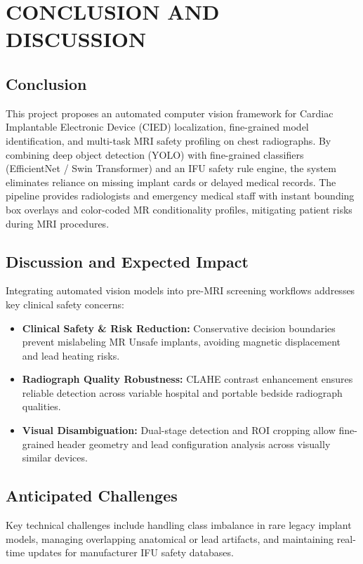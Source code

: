 \chapter*{CONCLUSION AND DISCUSSION}

\section{Conclusion}
This project proposes an automated computer vision framework for Cardiac Implantable Electronic Device (CIED) localization, fine-grained model identification, and multi-task MRI safety profiling on chest radiographs. By combining deep object detection (YOLO) with fine-grained classifiers (EfficientNet / Swin Transformer) and an IFU safety rule engine, the system eliminates reliance on missing implant cards or delayed medical records. The pipeline provides radiologists and emergency medical staff with instant bounding box overlays and color-coded MR conditionality profiles, mitigating patient risks during MRI procedures.

\section{Discussion and Expected Impact}
Integrating automated vision models into pre-MRI screening workflows addresses key clinical safety concerns:
\begin{itemize}
    \item \textbf{Clinical Safety \& Risk Reduction:} Conservative decision boundaries prevent mislabeling MR Unsafe implants, avoiding magnetic displacement and lead heating risks.
    \item \textbf{Radiograph Quality Robustness:} CLAHE contrast enhancement ensures reliable detection across variable hospital and portable bedside radiograph qualities.
    \item \textbf{Visual Disambiguation:} Dual-stage detection and ROI cropping allow fine-grained header geometry and lead configuration analysis across visually similar devices.
\end{itemize}

\section{Anticipated Challenges}
Key technical challenges include handling class imbalance in rare legacy implant models, managing overlapping anatomical or lead artifacts, and maintaining real-time updates for manufacturer IFU safety databases.

